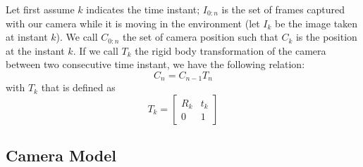 Let first assume \(k\) indicates the time instant; 
\(I_{0:n} \) is the set of frames 
captured with our camera while it is moving in the environment (let \(I_{k}\) 
be the image taken at instant \(k\)). We call \(C_{0:n}\) the set of camera 
position such that \(C_k\) is the position at the instant \(k\).
If we call \(T_k\) the rigid body transformation of the camera between two
consecutive time instant, we have the following relation:
\begin{equation*}
C_n = C_{n-1} T_n
\end{equation*}
\noindent with \(T_k\) that is defined as
\begin{equation*}
	T_k =
	\begin{bmatrix}
	R_k & t_k \\
	0 & 1
	\end{bmatrix}
\end{equation*}

\subsection{Camera Model}



